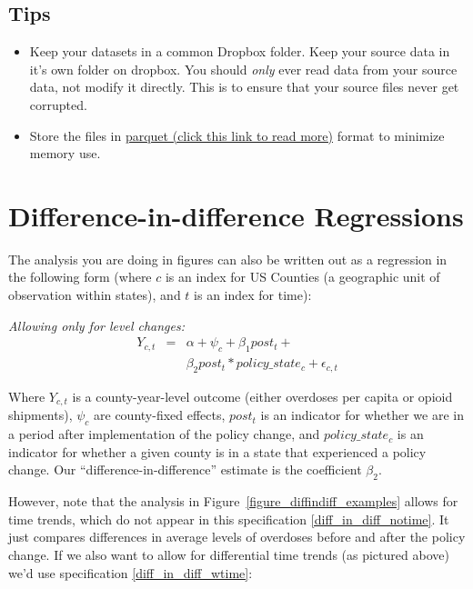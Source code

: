 \documentclass[12pt]{article}
\begin{document}
\subsection*{Tips}
\begin{itemize}
  \item Keep your datasets in a common Dropbox folder. Keep your source data in it's own folder on dropbox. You should \emph{only} ever read data from your source data, not modify it directly. This is to ensure that your source files never get corrupted.
  \item Store the files in \href{https://www.practicaldatascience.org/notebooks/PDS_not_yet_in_coursera/30_big_data/30_parquet.html}{parquet (click this link to read more)} format to minimize memory use.
\end{itemize}

\appendix

\section{Difference-in-difference Regressions}\label{appendix_diffindiff}

The analysis you are doing in figures can also be written out as a regression in the following form (where $c$ is an index for US Counties (a geographic unit of observation within states), and $t$ is an index for time):

\emph{Allowing only for level changes:}
\begin{eqnarray}
 Y_{c,t} &=& \alpha + \psi_{c} + \beta_1 post_{t} + \label{diff_in_diff_notime}\\
  && \beta_2 post_{t} * policy\_state_{c} + \epsilon_{c,t} \nonumber
\end{eqnarray}

Where $Y_{c,t}$ is a county-year-level outcome (either overdoses per capita or opioid shipments),  $\psi_c$ are county-fixed effects, $post_{t}$ is an indicator for whether we are in a period after implementation of the policy change, and $policy\_state_{c}$ is an indicator for whether a given county is in a state that experienced a policy change. Our ``difference-in-difference'' estimate is the coefficient $\beta_2$.

However, note that the analysis in Figure~\ref{figure_diffindiff_examples} allows for time trends, which do not appear in this specification \ref{diff_in_diff_notime}. It just compares differences in average levels of overdoses before and after the policy change. If we also want to allow for differential time trends (as pictured above) we'd use specification \ref{diff_in_diff_wtime}:
\end{document}
